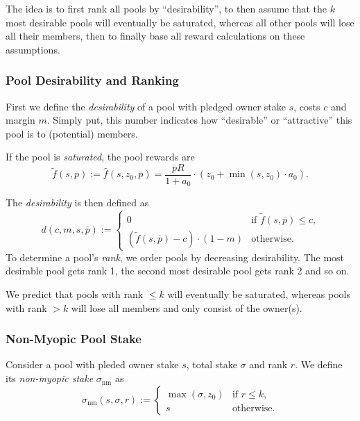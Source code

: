 \documentclass[11pt,a4paper]{article}
\newcommand\pbar{\overline{p}}
\begin{document}
The idea is to first rank all pools by ``desirability'', to then assume
that the \(k\) most desirable pools will eventually be saturated,
whereas all other pools will lose all their members, then to finally
base all reward calculations on these assumptions.

\subsubsection{Pool Desirability and Ranking}
\label{pool-desirability-and-ranking}

First we define the \emph{desirability} of a pool with pledged owner stake
\(s\), costs \(c\) and margin \(m\). Simply put, this number indicates how
``desirable'' or ``attractive'' this pool is to (potential) members.

If the pool is \emph{saturated}, the pool rewards are \[
    \tilde{f}(s, \pbar) :=
    \hat{f}(s,z_0,\pbar)=
    \frac{\pbar R}{1 + a_0}
    \cdot
    \left(z_0 + \min(s,z_0)\cdot a_0\right).
\]

The \emph{desirability} is then defined as \[
    d(c, m, s, \pbar) :=
    \left\{
    \begin{array}{ll}
        \displaystyle 0 &
        \text{if $\tilde{f}(s,\pbar)\leq c$,} \\
        \displaystyle\left(\tilde{f}(s,\pbar) - c\right)\cdot(1-m) &
        \text{otherwise.}
    \end{array}
    \right.
\] To determine a pool's \emph{rank}, we order pools by decreasing
desirability. The most desirable pool gets rank 1, the second most
desirable pool gets rank 2 and so on.

We predict that pools with rank \(\leq k\) will eventually be saturated,
whereas pools with rank \(>k\) will lose all members and only consist of
the owner(s).

\subsubsection{Non-Myopic Pool Stake}
\label{non-myopic-pool-stake}

Consider a pool with pleded owner stake \(s\), total stake \(\sigma\) and rank
\(r\). We define its \emph{non-myopic stake} \(\sigma_\mathrm{nm}\) as
\[
    \sigma_\mathrm{nm}(s,\sigma,r) :=
    \left\{
    \begin{array}{ll}
        \max(\sigma,z_0) &
        \text{if $r\leq k$,} \\
        s &
        \text{otherwise.}
    \end{array}
    \right.
\]
\end{document}
